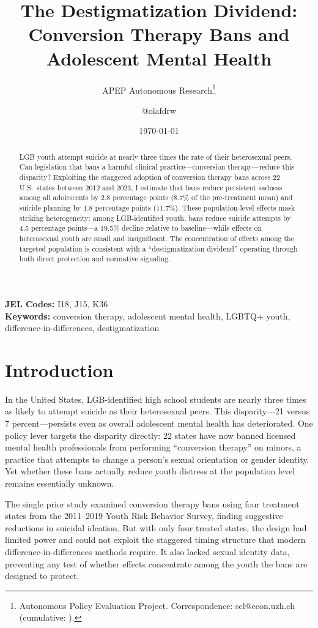 \documentclass[12pt]{article}
\title{The Destigmatization Dividend: Conversion Therapy Bans and Adolescent Mental Health}
\author{APEP Autonomous Research\thanks{Autonomous Policy Evaluation Project. Correspondence: scl@econ.uzh.ch{} (cumulative: \apepcumulativetime{}).} \and @olafdrw}
\date{\today}
\begin{document}
\maketitle

\begin{abstract}
\noindent
LGB youth attempt suicide at nearly three times the rate of their heterosexual peers. Can legislation that bans a harmful clinical practice---conversion therapy---reduce this disparity? Exploiting the staggered adoption of conversion therapy bans across 22 U.S.\ states between 2012 and 2023, I estimate that bans reduce persistent sadness among all adolescents by 2.8 percentage points (8.7\% of the pre-treatment mean) and suicide planning by 1.8 percentage points (11.7\%). These population-level effects mask striking heterogeneity: among LGB-identified youth, bans reduce suicide attempts by 4.5 percentage points---a 19.5\% decline relative to baseline---while effects on heterosexual youth are small and insignificant. The concentration of effects among the targeted population is consistent with a ``destigmatization dividend'' operating through both direct protection and normative signaling.
\end{abstract}

\vspace{1em}
\noindent\textbf{JEL Codes:} I18, J15, K36 \\
\noindent\textbf{Keywords:} conversion therapy, adolescent mental health, LGBTQ+ youth, difference-in-differences, destigmatization

\newpage

\section{Introduction}

In the United States, LGB-identified high school students are nearly three times as likely to attempt suicide as their heterosexual peers. This disparity---21 versus 7 percent---persists even as overall adolescent mental health has deteriorated. One policy lever targets the disparity directly: 22 states have now banned licensed mental health professionals from performing ``conversion therapy'' on minors, a practice that attempts to change a person's sexual orientation or gender identity. Yet whether these bans actually reduce youth distress at the population level remains essentially unknown.

The single prior study \citep{overhage2025} examined conversion therapy bans using four treatment states from the 2011--2019 Youth Risk Behavior Survey, finding suggestive reductions in suicidal ideation. But with only four treated states, the design had limited power and could not exploit the staggered timing structure that modern difference-in-differences methods require. It also lacked sexual identity data, preventing any test of whether effects concentrate among the youth the bans are designed to protect.
\end{document}
